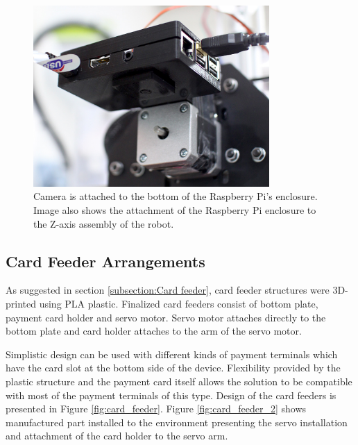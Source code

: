 \begin{figure}[ht]
  \begin{center}
    \includegraphics[width=9cm]{images/camera.jpg}
    \caption{Camera is attached to the bottom of the Raspberry Pi's enclosure. Image also shows the attachment of the Raspberry Pi enclosure to the Z-axis assembly of the robot.}
    \label{fig:camera}
  \end{center}
\end{figure}
\FloatBarrier


\subsection{Card Feeder Arrangements}
\label{subsection:Card feeder arrangements}

As suggested in section \ref{subsection:Card feeder}, card feeder structures were 3D-printed using PLA plastic. Finalized card feeders consist of bottom plate, payment card holder and servo motor. Servo motor attaches directly to the bottom plate and card holder attaches to the arm of the servo motor.

Simplistic design can be used with different kinds of payment terminals which have the card slot at the bottom side of the device. Flexibility provided by the plastic structure and the payment card itself allows the solution to be compatible with most of the payment terminals of this type. Design of the card feeders is presented in Figure \ref{fig:card_feeder}. Figure \ref{fig:card_feeder_2} shows manufactured part installed to the environment presenting the servo installation and attachment of the card holder to the servo arm.

